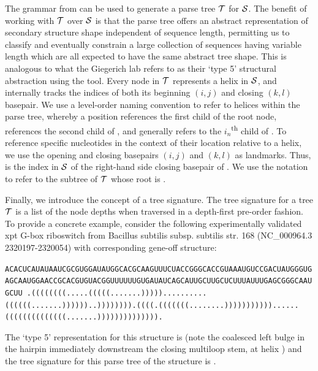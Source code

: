 The grammar from  can be used to generate a parse tree ${\mathcal T}$ for ${\mathcal S}$. The benefit of working with ${\mathcal T}$ over ${\mathcal S}$ is that the parse tree offers an abstract representation of secondary structure shape independent of sequence length, permitting us to classify and eventually constrain a large collection of sequences having variable length which are all expected to have the same abstract tree shape. This is analogous to what the Giegerich lab refers to as their `type 5' structural abstraction using the \rshapes tool. Every node in ${\mathcal T}$ represents a helix in ${\mathcal S}$, and internally tracks the indices of both its beginning $(i,j)$ and closing $(k,l)$ basepair. We use a level-order naming convention to refer to helices within the parse tree, whereby a position  references the first child of the root node,  references the second child of , and generally  refers to the $i_n$\textsuperscript{th} child of . To reference specific nucleotides in the context of their location relative to a helix, we use the opening and closing basepairs $(i,j)$ and $(k,l)$ as landmarks. Thus,  is the index in ${\mathcal S}$ of the right-hand side closing basepair of . We use the notation  to refer to the subtree of ${\mathcal T}$ whose root is .

Finally, we introduce the concept of a tree signature. The tree signature for a tree ${\mathcal T}$ is a list of the node depths when traversed in a depth-first pre-order fashion. To provide a concrete example, consider the following experimentally validated xpt G-box riboswitch from Bacillus subtilis subsp. subtilis str. 168 (NC\_000964.3 2320197-2320054) with corresponding gene-off structure:

\begin{center} \label{}
  \ssmall\tt ACACUCAUAUAAUCGCGUGGAUAUGGCACGCAAGUUUCUACCGGGCACCGUAAAUGUCCGACUAUGGGUGAGCAAUGGAACCGCACGUGUACGGUUUUUUGUGAUAUCAGCAUUGCUUGCUCUUUAUUUGAGCGGGCAAUGCUU
  \ssmall\tt .((((((((.....(((((.......)))))..........((((((.......))))))..)))))))).((((.(((((((........)))))))))))......((((((((((((((.......)))))))))))))).
\end{center}

The \rshapes `type 5' representation for this structure is \ms{[[][]][][]} (note the coalesced left bulge in the hairpin immediately downstream the closing multiloop stem, at helix ) and the tree signature for this parse tree of the structure is \ms{[0, 1, 2, 2, 1, 1]}.

